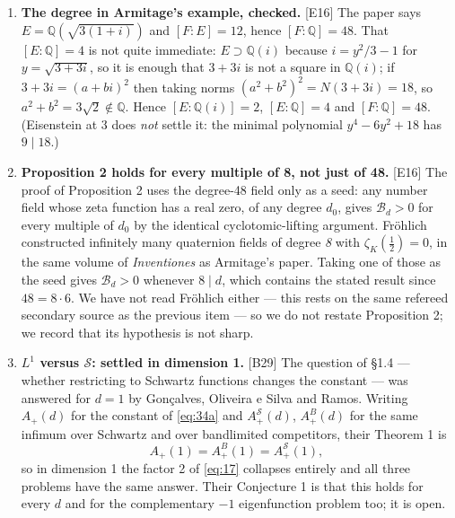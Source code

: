 \documentclass[11pt,reqno]{amsart}
\theoremstyle{plain}
\theoremstyle{definition}
\theoremstyle{remark}
\newcommand{\Q}{\mathbb{Q}}
\newcommand{\Ss}{\mathcal{S}}
\newcommand{\Bcal}{\mathcal{B}}
\newcommand{\Ledger}[1]{{\scriptsize\textsf{[#1]}}}
\begin{document}
\begin{enumerate}[leftmargin=1.6em,itemsep=5pt]
  What is worth noticing is \emph{how} Odlyzko's bound is proved. His explicit-formula
  method requires a function $F$ with $F>0$ and $\widehat F\ge0$, and the quality of
  the discriminant bound is governed by how good such an $F$ can be --- his survey
  poses ``what functions $f(x)$ satisfying $f(x)>0$ and having non-negative Fourier
  transforms give the best unconditional lower bounds for discriminants?'' as an open
  problem. That is an extremal problem with sign conditions on a function \emph{and} its
  transform: a first cousin of the problem of \S1. \S4 relates the two constants; it does
  not remark that the two \emph{methods} are of the same kind.

\item \textbf{The degree in Armitage's example, checked.} \Ledger{E16} The paper says
  $E=\Q(\sqrt{3(1+i)})$ and $[F:E]=12$, hence $[F:\Q]=48$. That $[E:\Q]=4$ is not quite
  immediate: $E\supset\Q(i)$ because $i=y^2/3-1$ for $y=\sqrt{3+3i}$, so it is enough
  that $3+3i$ is not a square in $\Q(i)$; if $3+3i=(a+bi)^2$ then taking norms
  $(a^2+b^2)^2=N(3+3i)=18$, so $a^2+b^2=3\sqrt2\notin\Q$. Hence $[E:\Q(i)]=2$,
  $[E:\Q]=4$ and $[F:\Q]=48$. (Eisenstein at 3 does \emph{not} settle it: the minimal
  polynomial $y^4-6y^2+18$ has $9\mid18$.)

\item \textbf{Proposition 2 holds for every multiple of 8, not just of 48.}
  \Ledger{E16} The proof of Proposition 2 uses the degree-48 field only as a seed: any
  number field whose zeta function has a real zero, of any degree $d_0$, gives
  $\Bcal_d>0$ for every multiple of $d_0$ by the identical cyclotomic-lifting argument.
  Fr\"ohlich constructed infinitely many quaternion fields of degree \emph{8} with
  $\zeta_K(\tfrac12)=0$, in the same volume of \emph{Inventiones} as Armitage's paper.
  Taking one of those as the seed gives $\Bcal_d>0$ whenever $8\mid d$, which contains
  the stated result since $48=8\cdot6$. We have not read Fr\"ohlich either --- this
  rests on the same refereed secondary source as the previous item --- so we do not
  restate Proposition 2; we record that its hypothesis is not sharp.

\item \textbf{$L^1$ versus $\Ss$: settled in dimension 1.} \Ledger{B29} The question
  of \S1.4 --- whether restricting to Schwartz functions changes the constant --- was
  answered for $d=1$ by Gon\c calves, Oliveira e Silva and Ramos. Writing $A_+(d)$ for
  the constant of \eqref{eq:34a} and $A_+^{\Ss}(d)$, $A_+^{B}(d)$ for the same infimum
  over Schwartz and over bandlimited competitors, their Theorem 1 is
  \[A_+(1)=A_+^{B}(1)=A_+^{\Ss}(1),\]
  so in dimension 1 the factor 2 of \eqref{eq:17} collapses entirely and all three
  problems have the same answer. Their Conjecture 1 is that this holds for every $d$
  and for the complementary $-1$ eigenfunction problem too; it is open.


\end{enumerate}
\end{document}
